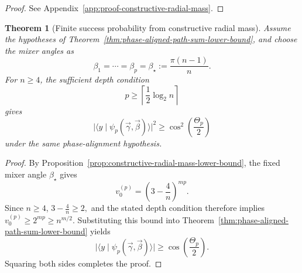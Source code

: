 \documentclass[a4paper,onecolumn,11pt,unpublished]{quantumarticle}
\newtheorem{theorem}{Theorem}
\newtheorem{corollary}[theorem]{Corollary}
\theoremstyle{remark}
\begin{document}
\begin{proof} See Appendix~\ref{app:proof-constructive-radial-mass}. \end{proof}






\begin{theorem}[Finite success probability from constructive radial mass]
\label{thm:constructive-radial-mass-success}
Assume the hypotheses of
Theorem~\ref{thm:phase-aligned-path-sum-lower-bound}, and choose
the mixer angles as
\[
\beta_1=\cdots=\beta_p
=
\beta_\star
:=
\frac{\pi(n-1)}{n}.
\]
For \(n\ge 4\), the sufficient depth condition
\[
p
\ge
\left\lceil
\frac{1}{2}\log_2 n
\right\rceil
\]
gives
\[
\bigl|
\langle y\mid
\psi_p(\vec\gamma,\vec\beta)
\rangle
\bigr|^2
\ge
\cos^2\!\left(\frac{\Theta_p}{2}\right)
\]
under the same phase-alignment hypothesis.
\end{theorem}

\begin{proof}
By
Proposition~\ref{prop:constructive-radial-mass-lower-bound},
the fixed mixer angle \(\beta_\star\) gives
\[
v_0^{(p)}
=
\left(3-\frac{4}{n}\right)^{mp}.
\]
Since \(n\ge4\),
\(
3-\frac{4}{n}\ge2,
\)
and the stated depth condition therefore implies
\(
v_0^{(p)}
\ge
2^{mp}
\ge
n^{m/2}.
\)
Substituting this bound into
Theorem~\ref{thm:phase-aligned-path-sum-lower-bound}
yields
\[
\bigl|
\langle y\mid
\psi_p(\vec\gamma,\vec\beta)
\rangle
\bigr|
\ge
\cos\!\left(\frac{\Theta_p}{2}\right).
\]
Squaring both sides completes the proof.
\end{proof}
\end{document}
